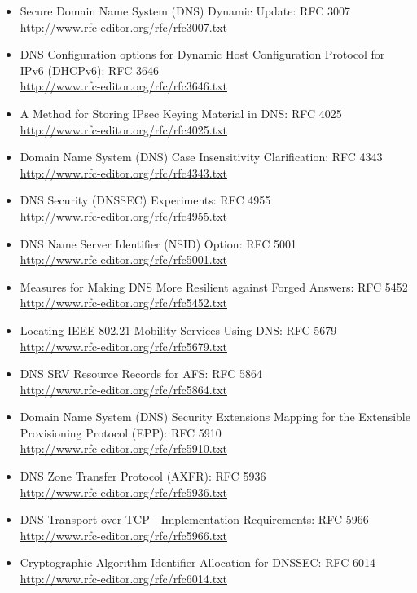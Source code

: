 \begin{itemize}
\begin{itemize}
\begin{itemize}
\item Secure Domain Name System (DNS) Dynamic Update: RFC 3007\\
\url{http://www.rfc-editor.org/rfc/rfc3007.txt}
\item DNS Configuration options for Dynamic Host Configuration Protocol 
for IPv6 (DHCPv6): RFC 3646\\
\url{http://www.rfc-editor.org/rfc/rfc3646.txt}
\item A Method for Storing IPsec Keying Material in DNS: RFC 4025\\
\url{http://www.rfc-editor.org/rfc/rfc4025.txt}
\item Domain Name System (DNS) Case Insensitivity Clarification: RFC 4343\\
\url{http://www.rfc-editor.org/rfc/rfc4343.txt}
\item DNS Security (DNSSEC) Experiments: RFC 4955\\
\url{http://www.rfc-editor.org/rfc/rfc4955.txt}
\item DNS Name Server Identifier (NSID) Option: RFC 5001\\
\url{http://www.rfc-editor.org/rfc/rfc5001.txt}
\item Measures for Making DNS More Resilient against Forged Answers: 
RFC 5452\\
\url{http://www.rfc-editor.org/rfc/rfc5452.txt}
\item Locating IEEE 802.21 Mobility Services Using DNS: RFC 5679\\
\url{http://www.rfc-editor.org/rfc/rfc5679.txt}
\item DNS SRV Resource Records for AFS: RFC 5864\\
\url{http://www.rfc-editor.org/rfc/rfc5864.txt}
\item Domain Name System (DNS) Security Extensions Mapping for the 
Extensible Provisioning Protocol (EPP): RFC 5910\\
\url{http://www.rfc-editor.org/rfc/rfc5910.txt}
\item DNS Zone Transfer Protocol (AXFR): RFC 5936\\
\url{http://www.rfc-editor.org/rfc/rfc5936.txt}
\item DNS Transport over TCP - Implementation Requirements: RFC 5966\\
\url{http://www.rfc-editor.org/rfc/rfc5966.txt}
\item Cryptographic Algorithm Identifier Allocation for DNSSEC: RFC 6014\\
\url{http://www.rfc-editor.org/rfc/rfc6014.txt}

\end{itemize}
\end{itemize}
\end{itemize}
